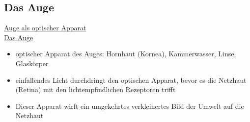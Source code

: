 \documentclass[a4paper,10pt,oneside]{article}
\begin{document}
\subsection{Das Auge}
\underline{Auge als optischer Apparat} \\

\underline{Das Auge} \\
	\begin{itemize}
		\item optischer Apparat des Auges: Hornhaut (Kornea), Kammerwasser, Linse, Glaskörper
		\item einfallendes Licht durchdringt den optischen Apparat, bevor es die Netzhaut (Retina) mit den lichtempfindlichen Rezeptoren trifft
		\item Dieser Apparat wirft ein umgekehrtes verkleinertes Bild der Umwelt auf die Netzhaut
	\end{itemize}
	
\end{document}
